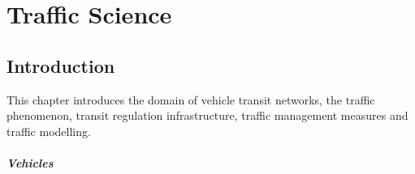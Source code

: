 \chapter{Traffic Science}
\label{chapter:traffic-science}

\section{Introduction}

This chapter introduces the domain of vehicle transit networks, the traffic phenomenon, transit regulation infrastructure, traffic management measures and traffic modelling.

\paragraph{Vehicles}

